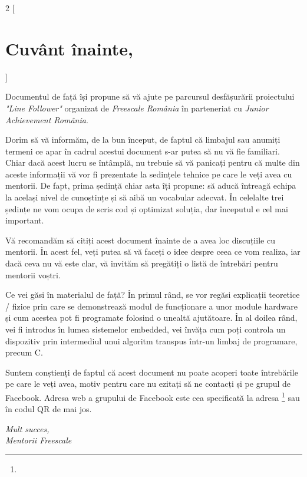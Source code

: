 \thispagestyle{empty}
\begin{multicols}{2}
[
\section*{Cuvânt înainte,}
]
\footnotesize {
Documentul de față își propune să vă ajute pe parcursul desfășurării proiectului \textit{"Line Follower"} organizat de \textit{Freescale România} în parteneriat cu \textit{Junior Achievement România}.

Dorim să vă informăm, de la bun început, de faptul că limbajul sau anumiți termeni ce apar în cadrul acestui document s-ar putea să nu vă fie familiari. Chiar dacă acest lucru se întâmplă, nu trebuie să vă panicați pentru că multe din aceste informații vă vor fi prezentate la sedințele tehnice pe care le veți avea cu mentorii. De fapt, prima ședință chiar asta îți propune: să aducă întreagă echipa la același nivel de cunoștințe și să aibă un vocabular adecvat. În celelalte trei ședințe ne vom ocupa de scris cod și optimizat soluția, dar începutul e cel mai important.

Vă recomandăm să citiți acest document înainte de a avea loc discuțiile cu mentorii. În acest fel, veți putea să vă faceți o idee despre ceea ce vom realiza, iar dacă ceva nu vă este clar, vă invităm să pregătiți o listă de întrebări pentru mentorii voștri.

Ce vei găsi în materialul de față? În primul rând, se vor regăsi explicații teoretice / fizice prin care se demonstrează modul de funcționare a unor module hardware și cum acestea pot fi programate folosind o unealtă ajutătoare. În al doilea rând, vei fi introdus în lumea sistemelor embedded, vei învăța cum poți controla un dispozitiv prin intermediul unui algoritm transpus într-un limbaj de programare, precum C.

Suntem conștienți de faptul că acest document nu poate acoperi toate întrebările pe care le veți avea, motiv pentru care nu ezitați să ne contacți și pe grupul de Facebook. Adresa web a grupului de Facebook este cea specificată la adresa \footnote{} sau în codul QR de mai jos.

}
\end{multicols}
\begin{flushright}\textit{Mult succes,\\Mentorii Freescale}\end{flushright}

\vspace{1cm}

\begin{center}
\end{center}

\restoregeometry